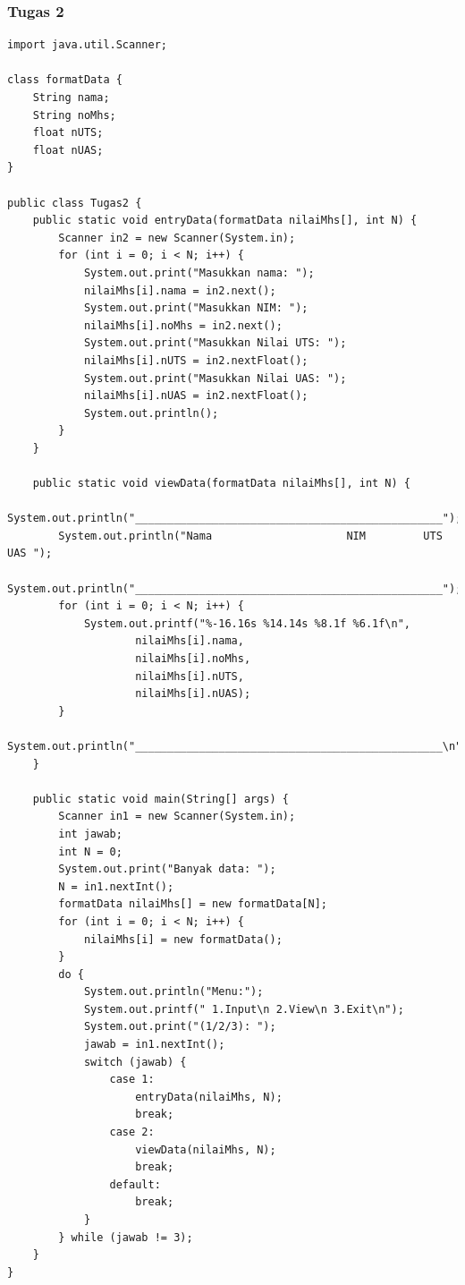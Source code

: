 \documentclass[a4paper,12pt]{article}
\begin{document}
\subsubsection{Tugas 2}
\begin{lstlisting}
import java.util.Scanner;

class formatData {
    String nama;
    String noMhs;
    float nUTS;
    float nUAS;
}

public class Tugas2 {
    public static void entryData(formatData nilaiMhs[], int N) {
        Scanner in2 = new Scanner(System.in);
        for (int i = 0; i < N; i++) {
            System.out.print("Masukkan nama: ");
            nilaiMhs[i].nama = in2.next();
            System.out.print("Masukkan NIM: ");
            nilaiMhs[i].noMhs = in2.next();
            System.out.print("Masukkan Nilai UTS: ");
            nilaiMhs[i].nUTS = in2.nextFloat();
            System.out.print("Masukkan Nilai UAS: ");
            nilaiMhs[i].nUAS = in2.nextFloat();
            System.out.println();
        }
    }

    public static void viewData(formatData nilaiMhs[], int N) {
        System.out.println("________________________________________________");
        System.out.println("Nama                     NIM         UTS    UAS ");
        System.out.println("________________________________________________");
        for (int i = 0; i < N; i++) {
            System.out.printf("%-16.16s %14.14s %8.1f %6.1f\n",
                    nilaiMhs[i].nama,
                    nilaiMhs[i].noMhs,
                    nilaiMhs[i].nUTS,
                    nilaiMhs[i].nUAS);
        }
        System.out.println("________________________________________________\n");
    }

    public static void main(String[] args) {
        Scanner in1 = new Scanner(System.in);
        int jawab;
        int N = 0;
        System.out.print("Banyak data: ");
        N = in1.nextInt();
        formatData nilaiMhs[] = new formatData[N];
        for (int i = 0; i < N; i++) {
            nilaiMhs[i] = new formatData();
        }
        do {
            System.out.println("Menu:");
            System.out.printf(" 1.Input\n 2.View\n 3.Exit\n");
            System.out.print("(1/2/3): ");
            jawab = in1.nextInt();
            switch (jawab) {
                case 1:
                    entryData(nilaiMhs, N);
                    break;
                case 2:
                    viewData(nilaiMhs, N);
                    break;
                default:
                    break;
            }
        } while (jawab != 3);
    }
}
\end{lstlisting}
\end{document}

